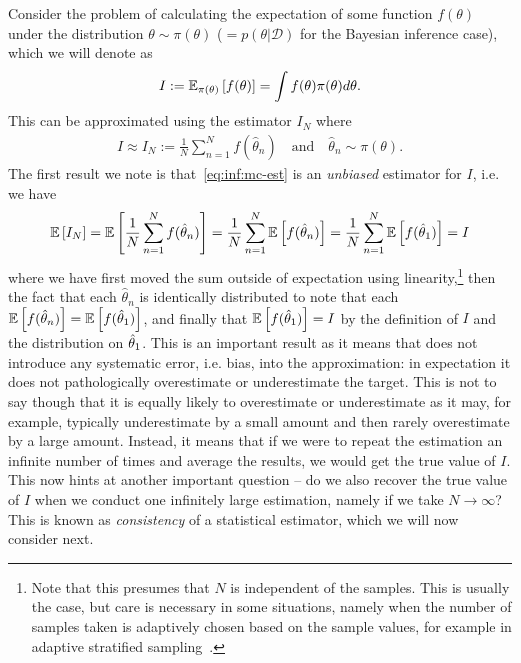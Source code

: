 Consider the problem of calculating the expectation of some function
$f(\theta)$ under the distribution $\theta\sim \pi(\theta)$ ($= p(\theta | \mathcal{D})$ for the Bayesian
inference case), which we will denote 
as
\begin{align}
	\label{eq:inf:expt}
I:=\mathbb{E}_{\pi(\theta)} \left[f(\theta)\right]=\int f(\theta) \pi(\theta) d\theta.
\end{align}
This can be approximated using the \mc estimator $I_N$ where
\begin{align}
	\label{eq:inf:mc-est}
	I \approx I_N := \frac{1}{N} \sum_{n=1}^{N}f(\hat{\theta}_n)
	\quad \text{and} \quad \hat{\theta}_n \sim \pi(\theta).
\end{align}
The first result we note is that~\eqref{eq:inf:mc-est} is an \emph{unbiased} estimator for $I$, i.e. we have
\begin{align}
\label{eq:inf:unbiased}
\mathbb{E} \left[I_N\right] = \mathbb{E} \left[\frac{1}{N} \sum_{n=1}^{N}f(\hat{\theta}_n)\right]
= \frac{1}{N} \sum_{n=1}^{N} \mathbb{E} \left[f(\hat{\theta}_n)\right]
= \frac{1}{N} \sum_{n=1}^{N} \mathbb{E} \left[f(\hat{\theta}_1)\right]
= I
\end{align}
where we have first moved the sum outside of expectation using
linearity,\footnote{Note that this presumes that $N$ is independent
	of the samples.  This is usually the case, but care is necessary in some situations, namely when
	the number of samples taken is adaptively chosen based on the sample values, for example in
	adaptive stratified sampling~\citep{etore2010adaptive}.}
then the fact that each $\hat{\theta}_n$ is identically distributed to note that
each $\mathbb{E} \left[f(\hat{\theta}_n)\right]= \mathbb{E} \left[f(\hat{\theta}_1)\right]$, and finally
that $\mathbb{E} \left[f(\hat{\theta}_1)\right] = I$ by the definition of $I$ and the distribution
on $\hat{\theta}_1$.  This is an important result as it means that \mc does not introduce
any systematic error, i.e. bias, into the approximation: in expectation it does not
pathologically overestimate or underestimate the target.  This is not to say though that it is
equally likely to overestimate or underestimate as it may, for example, typically underestimate
by a small amount and then rarely overestimate by a large amount.  Instead, it means that if we
were to repeat the estimation an infinite number of times and average the results, we would
get the true value of $I$.  This now hints at another important question -- do we also
recover the true value of $I$ when we conduct one infinitely large estimation, namely if we
take $N\rightarrow\infty$?  This is known as \emph{consistency} of a statistical estimator,
which we will now consider next.  

